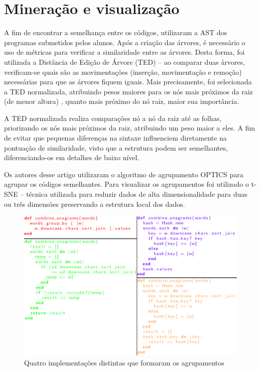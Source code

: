 	\section{Mineração e visualização}
	\label{sec:TrabRel}
	
		A fim de encontrar a semelhança entre os códigos, 
		utilizaram a AST dos programas submetidos pelos alunos. Após a criação das
		árvores, é necessário o uso de métricas para verificar a similaridade entre
		as árvores. Desta forma, foi utilizada a Distância de Edição de Árvore (TED)
		– ao comparar duas árvores, verificam-se quais são as movimentações (inserção,
		movimentação e remoção) necessárias para que as árvores fiquem iguais. Mais
		precisamente, foi selecionada a TED normalizada, atribuindo pesos maiores para
		os nós mais próximos da raiz (de menor altura) \cite{zhang1989simple}, quanto
		mais próximo do nó raiz, maior sua importância.

		A TED normalizada realiza comparações nó a nó da raiz até as folhas, priorizando
		os nós mais próximos da raiz, atribuindo um peso maior a eles. A fim de evitar
		que pequenas diferenças na sintaxe influenciem diretamente na pontuação de
		similaridade, visto que a estrutura podem ser semelhantes, diferenciando-os
		em detalhes de baixo nível.
		
		Os autores desse artigo utilizaram o algoritmo de agrupamento OPTICS
		\cite{Ankerst1999} para agrupar os códigos semelhantes. Para visualizar os
		agrupamentos foi utilizado o t-SNE \cite{maaten2008} – técnica utilizada para
		reduzir dados de alta dimensionalidade para duas ou três dimensões preservando
		a estrutura local dos dados.
		
		
		\begin{figure}[h]
		\centering
		\includegraphics[width=0.7\linewidth]{imagem/implementacoesYin}
		\caption[Quatro implementações distintas que formaram os agrupamentos]{Quatro implementações distintas que formaram os agrupamentos \cite{Yin:2015}}
		\label{fig:implementacoesYin}
		\end{figure}

